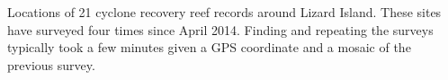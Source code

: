 \label{fig:sitemap} Locations of 21 cyclone recovery reef records around Lizard Island. These sites have surveyed four times since April 2014. Finding and repeating the surveys typically took a few minutes given a GPS coordinate and a mosaic of the previous survey.
